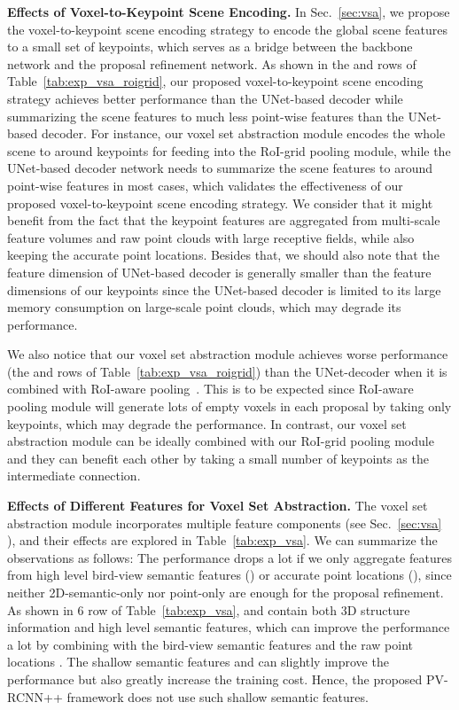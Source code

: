 \documentclass[natbib,twocolumn]{svjour3}          \smartqed  \usepackage{graphicx}
\begin{document}
\noindent
\textbf{Effects of Voxel-to-Keypoint Scene Encoding.}
In Sec.~\ref{sec:vsa}, we propose the voxel-to-keypoint scene encoding strategy to encode the global scene features to a small set of keypoints, which serves as a bridge between the backbone network and the proposal refinement network.
As shown in the  and  rows of Table~\ref{tab:exp_vsa_roigrid}, 
our proposed voxel-to-keypoint scene encoding strategy achieves 
better performance than the UNet-based decoder while summarizing the scene features to much less point-wise features than the UNet-based decoder.
For instance, our voxel set abstraction module encodes the whole scene to around  keypoints for feeding into the RoI-grid pooling module, while the UNet-based decoder network needs to summarize the scene features to around  point-wise features in most cases, which validates the effectiveness of our proposed voxel-to-keypoint scene encoding strategy. 
We consider that it might benefit from the fact that the keypoint features are aggregated from multi-scale feature volumes and raw point clouds with large receptive fields,  
while also keeping the accurate point locations. 
Besides that, we should also note that the feature dimension of UNet-based decoder is generally smaller than the feature dimensions of our keypoints since the UNet-based decoder is limited to its large memory consumption on large-scale point clouds, which may degrade its performance.

We also notice that our voxel set abstraction module achieves worse performance (the  and  rows of Table~\ref{tab:exp_vsa_roigrid}) than the UNet-decoder when it is combined with RoI-aware pooling~\citep{shi2020part}. This is to be expected since RoI-aware pooling module will generate lots of empty voxels in each proposal by taking only  keypoints, which may degrade the performance. 
In contrast, our voxel set abstraction module can be ideally combined with our RoI-grid pooling module and they can benefit each other by taking a small number of keypoints as the intermediate connection. 




\noindent
\textbf{Effects of Different Features for Voxel Set Abstraction.}
The voxel set abstraction module incorporates multiple feature components (see Sec.~\ref{sec:vsa} ), and their effects are explored in Table~\ref{tab:exp_vsa}. We can summarize the observations as follows: 
 The performance drops a lot if we only aggregate features from high level bird-view semantic features () or accurate point locations (), since neither 2D-semantic-only nor point-only are enough for the proposal refinement. 
 As shown in 6 row of Table~\ref{tab:exp_vsa},  and  contain both 3D structure information and high level semantic features, which can improve the performance a lot by combining with the bird-view semantic features  and the raw point locations . 
 The shallow semantic features  and  can slightly improve the performance but also greatly increase the training cost. Hence, the proposed PV-RCNN++ framework does not use such shallow semantic features.
\end{document}

